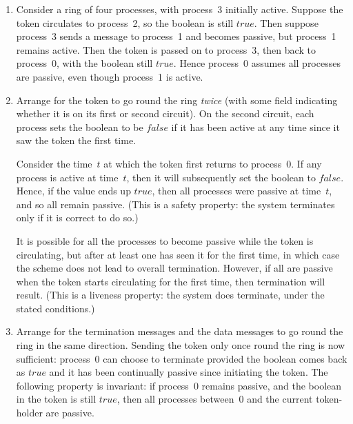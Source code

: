 
\begin{answer}
\begin{enumerate}
\item
Consider a ring of four processes, with process~3 initially active.  Suppose
the token circulates to process~2, so the boolean is still $true$.  Then
suppose process~3 sends a message to process~1 and becomes passive, but
process~1 remains active.  Then the token is passed on to process~3, then
back to process~0, with the boolean still $true$.  Hence process~0 assumes all
processes are passive, even though process~1 is active.


\item Arrange for the token to go round the ring \emph{twice} (with some field
indicating whether it is on its first or second circuit).  On the second
circuit, each process sets the boolean to be $false$ if it has been active at
any time since it saw the token the first time.

Consider the time~$t$ at which the token first returns to process~0.  If
any process is active at time~$t$, then it will subsequently set the boolean
to $false$.  Hence, if the value ends up $true$, then all processes were
passive at time~$t$, and so all remain passive.  (This is a safety property:
the system terminates only if it is correct to do so.) 

It is possible for all the processes to become passive while the token is
circulating, but after at least one has seen it for the first time, in which
case the scheme does not lead to overall termination.  However, if all are
passive when the token starts circulating for the first time, then termination
will result.  (This is a liveness property: the system does terminate,
under the stated conditions.)



\item Arrange for the termination messages and the data messages to go round
the ring in the same direction.  Sending the token only once round the ring is
now sufficient: process~0 can choose to terminate provided the boolean comes
back as $true$ and it has been continually passive since initiating the token.
The following property is invariant: if process~0 remains passive, and the
boolean in the token is still $true$, then all processes between~0 and the
current token-holder are passive.


\end{enumerate}
\end{answer}
